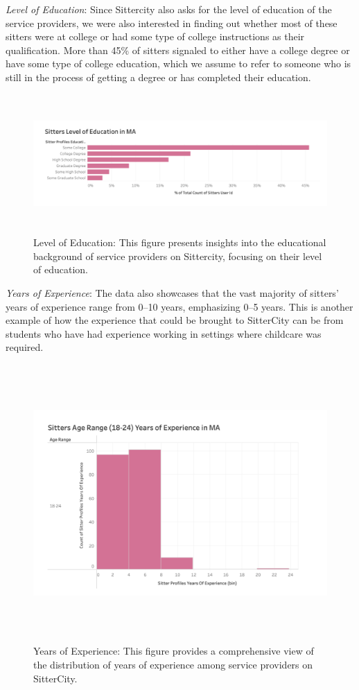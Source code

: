 \documentclass[12pt]{article}
\begin{document}
\newpage

\emph{Level of Education}: Since Sittercity also asks for the level of
education of the service providers, we were also interested in finding
out whether most of these sitters were at college or had some type of
college instructions as their qualification. More than 45\% of sitters
signaled to either have a college degree or have some type of college
education, which we assume to refer to someone who is still in the
process of getting a degree or has completed their education.

\begin{figure}
\centering
\includegraphics[width=6.25in,height=2.08333in]{IMAGES/sitterslevelofedu.png}
\caption{Level of Education: This figure presents insights into the
educational background of service providers on Sittercity, focusing on
their level of education.}
\end{figure}

\newpage

\emph{Years of Experience}: The data also showcases that the vast
majority of sitters' years of experience range from 0--10 years,
emphasizing 0--5 years. This is another example of how the experience
that could be brought to SitterCity can be from students who have had
experience working in settings where childcare was required.

\begin{figure}
\centering
\includegraphics[width=4.79167in,height=4.16667in]{IMAGES/sittersexperience.png}
\caption{Years of Experience: This figure provides a comprehensive view
of the distribution of years of experience among service providers on
SitterCity.}
\end{figure}
\end{document}
